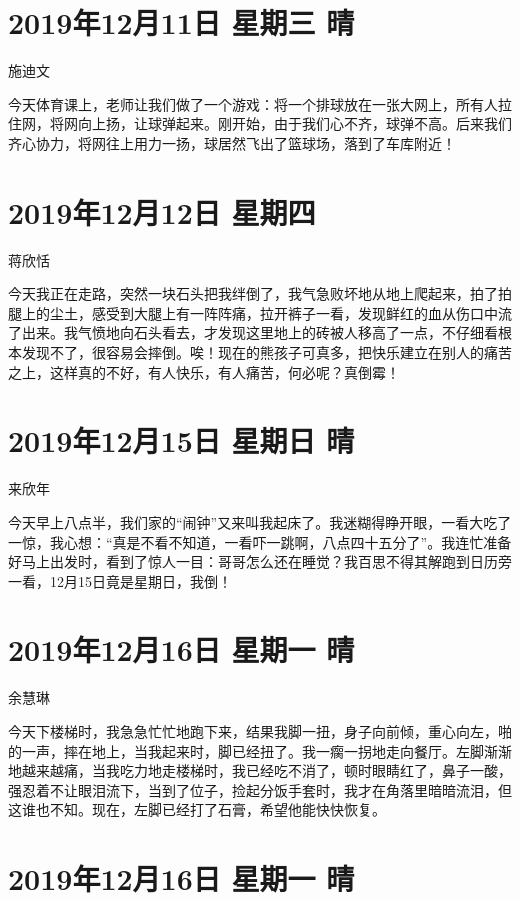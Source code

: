 \section{2019年12月11日 星期三 晴}

施迪文

今天体育课上，老师让我们做了一个游戏：将一个排球放在一张大网上，所有人拉住网，将网向上扬，让球弹起来。刚开始，由于我们心不齐，球弹不高。后来我们齐心协力，将网往上用力一扬，球居然飞出了篮球场，落到了车库附近！

\section{2019年12月12日 星期四}

蒋欣恬

今天我正在走路，突然一块石头把我绊倒了，我气急败坏地从地上爬起来，拍了拍腿上的尘土，感受到大腿上有一阵阵痛，拉开裤子一看，发现鲜红的血从伤口中流了出来。我气愤地向石头看去，才发现这里地上的砖被人移高了一点，不仔细看根本发现不了，很容易会摔倒。唉！现在的熊孩子可真多，把快乐建立在别人的痛苦之上，这样真的不好，有人快乐，有人痛苦，何必呢？真倒霉！

\section{2019年12月15日 星期日 晴}

来欣年

今天早上八点半，我们家的“闹钟”又来叫我起床了。我迷糊得睁开眼，一看大吃了一惊，我心想：“真是不看不知道，一看吓一跳啊，八点四十五分了”。我连忙准备好马上出发时，看到了惊人一目：哥哥怎么还在睡觉？我百思不得其解跑到日历旁一看，12月15日竟是星期日，我倒！

\section{2019年12月16日 星期一 晴}

余慧琳

今天下楼梯时，我急急忙忙地跑下来，结果我脚一扭，身子向前倾，重心向左，啪的一声，摔在地上，当我起来时，脚已经扭了。我一瘸一拐地走向餐厅。左脚渐渐地越来越痛，当我吃力地走楼梯时，我已经吃不消了，顿时眼睛红了，鼻子一酸，强忍着不让眼泪流下，当到了位子，捡起分饭手套时，我才在角落里暗暗流泪，但这谁也不知。现在，左脚已经打了石膏，希望他能快快恢复。

\section{2019年12月16日 星期一 晴}

